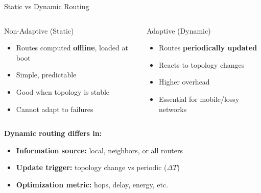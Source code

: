 \documentclass[aspectratio=169,11pt]{beamer}
\begin{document}
\begin{frame}{Static vs Dynamic Routing}
    \begin{columns}
        \begin{block}{Non-Adaptive (Static)}
            \begin{itemize}
                \item Routes computed \textbf{offline}, loaded at boot
                \item Simple, predictable
                \item Good when topology is stable
                \item Cannot adapt to failures
            \end{itemize}
        \end{block}
        
        \begin{block}{Adaptive (Dynamic)}
            \begin{itemize}
                \item Routes \textbf{periodically updated}
                \item Reacts to topology changes
                \item Higher overhead
                \item Essential for mobile/lossy networks
            \end{itemize}
        \end{block}
    \end{columns}
    
    \vspace{0.5cm}
    \textbf{Dynamic routing differs in:}
    \begin{itemize}
        \item \textbf{Information source:} local, neighbors, or all routers
        \item \textbf{Update trigger:} topology change vs periodic ($\Delta T$)
        \item \textbf{Optimization metric:} hops, delay, energy, etc.
    \end{itemize}
\end{frame}
\end{document}
